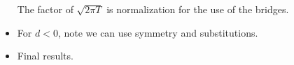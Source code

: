 \begin{itemize}
    The factor of $\sqrt{2\pi T}$ is normalization for the use of the bridges.  
  \item For $d<0$, note we can use symmetry and substitutions. 

    \item Final results.


\end{itemize}
